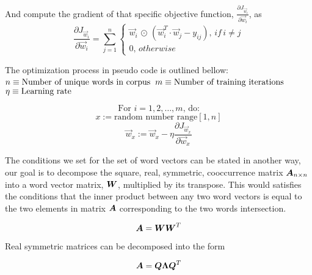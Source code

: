 \documentclass{article}
\begin{document}
And compute the gradient of that specific objective function, $\frac{\partial J_{\vec{w}_{i}}}{\partial \vec{w}_{i}}$, as
\begin{equation*}
\frac{\partial J_{\vec{w}_{i}}}{\partial \vec{w}_{i}} = \sum_{j=1}^{n}{\begin{cases}
\vec{w}_{i} \, \odot \, \left( \vec{w}_{i}^T \cdot \vec{w}_{j} - y_{ij} \right), \, if \, i \neq j
\\
0, \, otherwise
\end{cases}}
\end{equation*}

The optimization process in pseudo code is outlined bellow:
$\\\\ n \equiv \text{Number of unique words in corpus}$
$\\ m \equiv \text{Number of training iterations}$
$\\ \eta \equiv \text{Learning rate}$

\begin{equation*}
\text{For $i = 1,2, \ldots , m$, do:}
\end{equation*}
\begin{equation*}
x := \text{random number range} [1,n]
\end{equation*}
\begin{equation*}
\vec{w}_{x} := \vec{w}_{x} - \eta \frac{\partial J_{\vec{w}_{x}}}{\partial \vec{w}_{x}}
\end{equation*}


%
%

The conditions we set for the set of word vectors can be stated in another way, our goal is to decompose the square, real, symmetric, cooccurrence matrix $\boldsymbol{{A}}_{{n} \times {n}}$ into a word vector matrix, $\boldsymbol{W}$, multiplied by its transpose. This would satisfies the conditions that the inner product between any two word vectors is equal to the two elements in matrix $\boldsymbol{A}$ corresponding to the two words intersection.

\begin{equation*}
\boldsymbol{A} = \boldsymbol{W}\boldsymbol{W}^T
\end{equation*}

Real symmetric matrices can be decomposed into the form

\begin{equation*}
\boldsymbol{A} = \boldsymbol{Q}\boldsymbol{\Lambda}\boldsymbol{Q}^T
\end{equation*}
\end{document}
